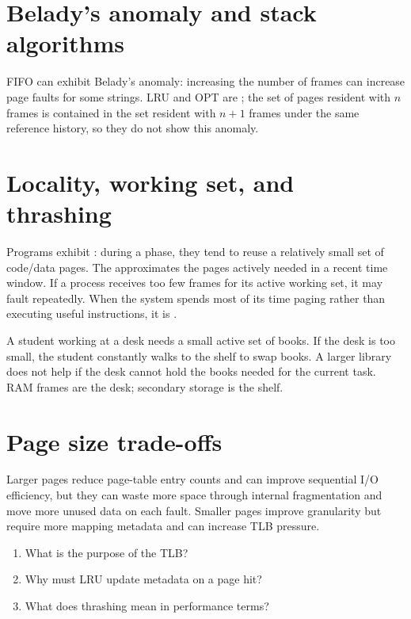 \section{Belady's anomaly and stack algorithms}
FIFO can exhibit Belady's anomaly: increasing the number of frames can increase page faults for some strings. LRU and OPT are ; the set of pages resident with $n$ frames is contained in the set resident with $n+1$ frames under the same reference history, so they do not show this anomaly.

\section{Locality, working set, and thrashing}
Programs exhibit : during a phase, they tend to reuse a relatively small set of code/data pages. The  approximates the pages actively needed in a recent time window. If a process receives too few frames for its active working set, it may fault repeatedly. When the system spends most of its time paging rather than executing useful instructions, it is .

\begin{analogy}
A student working at a desk needs a small active set of books. If the desk is too small, the student constantly walks to the shelf to swap books. A larger library does not help if the desk cannot hold the books needed for the current task. RAM frames are the desk; secondary storage is the shelf.
\end{analogy}

\section{Page size trade-offs}
Larger pages reduce page-table entry counts and can improve sequential I/O efficiency, but they can waste more space through internal fragmentation and move more unused data on each fault. Smaller pages improve granularity but require more mapping metadata and can increase TLB pressure.

\begin{quickcheck}
\begin{enumerate}
  \item What is the purpose of the TLB?
  \item Why must LRU update metadata on a page hit?
  \item What does thrashing mean in performance terms?
\end{enumerate}
\end{quickcheck}
